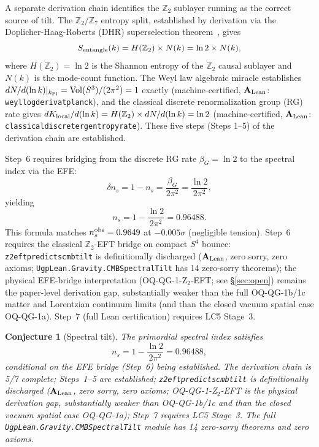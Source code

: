 \documentclass[11pt]{article}
\newtheorem{conjecture}[theorem]{Conjecture}
\theoremstyle{remark}
\newcommand{\lean}[1]{%
  \penalty-100
  \begingroup\def\_{\textunderscore\allowbreak}\texttt{#1}\endgroup}
\newcommand{\CatAL}{\ensuremath{\textbf{A}_{\rm Lean}}}
\begin{document}
A separate derivation chain identifies the $\mathbb{Z}_2$ sublayer running as the
correct source of tilt.  The $\mathbb{Z}_2/\mathbb{Z}_7$ entropy split, established by
derivation via the Doplicher-Haag-Roberts (DHR) superselection theorem~\cite{Doplicher1971}, gives
\begin{equation}
  S_{\rm entangle}(k) = H(\mathbb{Z}_2)\times N(k) = \ln 2 \times N(k),
  \label{eq:z2z7_split}
\end{equation}
where $H(\mathbb{Z}_2)=\ln 2$ is the Shannon entropy of the $\mathbb{Z}_2$ causal
sublayer and $N(k)$ is the mode-count function.  The Weyl law algebraic miracle
establishes $dN/d(\ln k)|_{k_{\rm Pl}} = \mathrm{Vol}(S^3)/(2\pi^2) = 1$ exactly
(machine-certified, $\CatAL$: \lean{weyl\_log\_deriv\_at\_planck}), and the classical discrete
renormalization group (RG) rate gives $dK_{\rm local}/d(\ln k) = H(\mathbb{Z}_2)\times dN/d(\ln k) = \ln 2$
(machine-certified, $\CatAL$: \lean{classical\_discrete\_rg\_entropy\_rate}).  These
five steps (Steps 1--5) of the derivation chain are established.

Step~6 requires bridging from the discrete RG rate $\beta_G = \ln 2$ to the spectral
index via the EFE:
\begin{equation}
  \delta n_s = 1 - n_s = \frac{\beta_G}{2\pi^2} = \frac{\ln 2}{2\pi^2},
\end{equation}
yielding
\begin{equation}
  n_s = 1 - \frac{\ln 2}{2\pi^2} = 0.96488.
  \label{eq:ns_formula}
\end{equation}
This formula matches $n_s^{\rm obs} = 0.9649$ at $-0.005\sigma$ (negligible tension).
Step~6 requires the classical $\mathbb{Z}_2$-EFT bridge on compact $S^4$ bounce:
\lean{z2\_eft\_predicts\_cmb\_tilt} is definitionally discharged ($\CatAL$, zero sorry, zero axioms;
\lean{UgpLean.Gravity.CMBSpectralTilt} has 14 zero-sorry theorems); the physical EFE-bridge
interpretation (OQ-QG-1-Z$_2$-EFT; see \S\ref{sec:open}) remains the paper-level derivation gap,
substantially weaker than the full OQ-QG-1b/1c matter and Lorentzian continuum limits (and
than the closed vacuum spatial case OQ-QG-1a).  Step~7 (full Lean
certification) requires LC5 Stage~3.

\begin{conjecture}[Spectral tilt]
\label{conj:ns}
The primordial spectral index satisfies
\begin{equation}
  n_s = 1 - \frac{\ln 2}{2\pi^2} = 0.96488,
\end{equation}
conditional on the EFE bridge (Step~6) being established.  The derivation chain is
5/7 complete; Steps~1--5 are established; \lean{z2\_eft\_predicts\_cmb\_tilt} is
definitionally discharged ($\CatAL$, zero sorry, zero axioms; OQ-QG-1-Z$_2$-EFT is the
physical derivation gap, substantially weaker than OQ-QG-1b/1c and than the closed
vacuum spatial case OQ-QG-1a); Step~7 requires LC5 Stage~3.
The full \lean{UgpLean.Gravity.CMBSpectralTilt} module has 14 zero-sorry theorems and zero axioms.
\end{conjecture}
\end{document}
